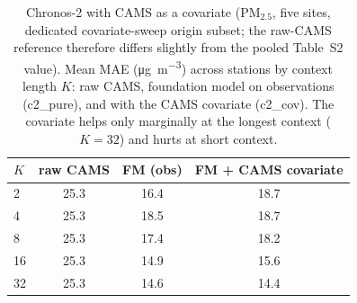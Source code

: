 \documentclass[11pt]{article}
\newcommand*{\pmtf}{\ensuremath{\mathrm{PM_{2.5}}}}
\begin{document}
\begin{table}[htbp]\centering\footnotesize
\caption{Chronos-2 with CAMS as a covariate (\pmtf{}, five sites, dedicated covariate-sweep origin subset; the raw-CAMS reference therefore differs slightly from the pooled Table~S2 value). Mean MAE (\si{\micro\gram\per\cubic\metre}) across stations by context length $K$: raw CAMS, foundation model on observations (c2\_pure), and with the CAMS covariate (c2\_cov). The covariate helps only marginally at the longest context ($K=32$) and hurts at short context.}
\begin{tabular}{lccc}\toprule
$K$ & raw CAMS & FM (obs) & FM + CAMS covariate \\ \midrule
2 & 25.3 & 16.4 & 18.7 \\
4 & 25.3 & 18.5 & 18.7 \\
8 & 25.3 & 17.4 & 18.2 \\
16 & 25.3 & 14.9 & 15.6 \\
32 & 25.3 & 14.6 & 14.4 \\
\bottomrule\end{tabular}\end{table}
\end{document}
